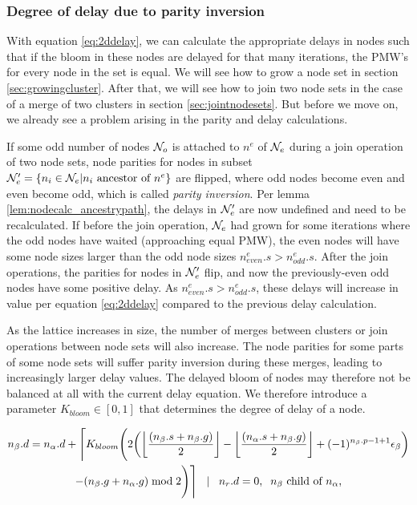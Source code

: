 \subsubsection{Degree of delay due to parity inversion }

With equation \ref{eq:2ddelay}, we can calculate the appropriate delays in nodes such that if the bloom in these nodes are delayed for that many iterations, the PMW's for every node in the set is equal. We will see how to grow a node set in section \ref{sec:growingcluster}. After that, we will see how to join two node sets in the case of a merge of two clusters in section \ref{sec:jointnodesets}. But before we move on, we already see a problem arising in the parity and delay calculations.

If some odd number of nodes $\mathcal{N}_o$ is attached to $n^e$ of $\mathcal{N}_e$ during a join operation of two node sets, node parities for nodes in subset $\mathcal{N}_e'= \{n_i \in \mathcal{N}_e | n_i \mbox{ ancestor of } n^e\}$ are flipped, where odd nodes become even and even become odd, which is called \emph{parity inversion}. Per lemma \ref{lem:nodecalc_ancestrypath}, the delays in $\mathcal{N}_e'$ are now undefined and need to be recalculated. If before the join operation, $\mathcal{N}_e$ had grown for some iterations where the odd nodes have waited (approaching equal PMW), the even nodes will have some node sizes larger than the odd node sizes $n^e_{even}.s > n^e_{odd}.s$. After the join operations, the parities for nodes in $\mathcal{N}_e'$ flip, and now the previously-even odd nodes have some positive delay. As $n^e_{even}.s > n^e_{odd}.s$, these delays will increase in value per equation \ref{eq:2ddelay} compared to the previous delay calculation.

As the lattice increases in size, the number of merges between clusters or join operations between node sets will also increase. The node parities for some parts of some node sets will suffer parity inversion during these merges, leading to increasingly larger delay values. The delayed bloom of nodes may therefore not be balanced at all with the current delay equation. We therefore introduce a parameter $K_{bloom} \in [0, 1]$ that determines the degree of delay of a node.

\begin{multline}\label{eq:delayequation}
  n_\beta.d = n_\alpha.d + \Bigg \lceil K_{bloom} \Bigg( 2\bigg({\left \lfloor \frac{(n_\beta.s+n_\beta.g)}{2} \right \rfloor } - {\left \lfloor \frac{(n_\alpha.s+n_\beta.g)}{2} \right \rfloor } + (-1)^{n_\beta.p-1+1}\epsilon_\beta\bigg) \\
   - (n_\beta.g + n_\alpha.g)\bmod 2 \Bigg) \Bigg \rceil \hspace{.3cm} | \hspace{.3cm} n_r.d = 0, \hspace{.2cm} n_\beta \mbox{ child of } n_\alpha,
\end{multline}

